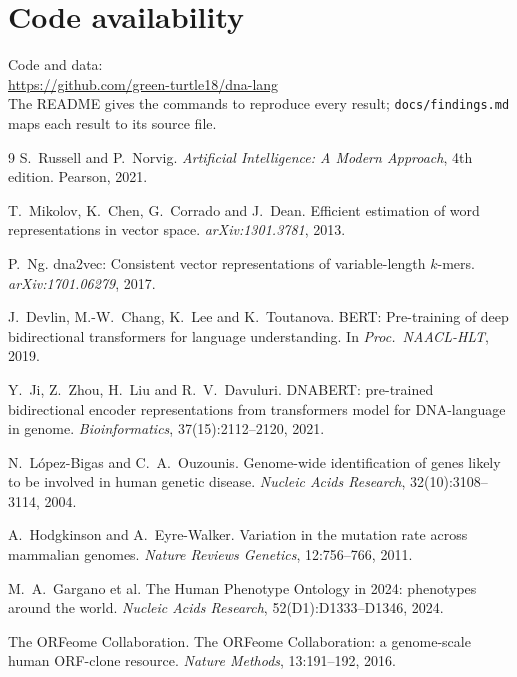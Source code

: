 \documentclass[11pt,a4paper,twocolumn]{article}
\newcommand{\githuburl}{https://github.com/green-turtle18/dna-lang}
\begin{document}
\section*{Code availability}
\noindent Code and data:\\
\url{\githuburl}\\
The README gives the commands to reproduce every result; \texttt{docs/findings.md}
maps each result to its source file.

\begin{thebibliography}{9}
\small
{}
S.~Russell and P.~Norvig.
\newblock \emph{Artificial Intelligence: A Modern Approach}, 4th edition.
\newblock Pearson, 2021.

T.~Mikolov, K.~Chen, G.~Corrado and J.~Dean.
\newblock Efficient estimation of word representations in vector space.
\newblock \emph{arXiv:1301.3781}, 2013.

P.~Ng.
\newblock dna2vec: Consistent vector representations of variable-length
  $k$-mers.
\newblock \emph{arXiv:1701.06279}, 2017.

J.~Devlin, M.-W.~Chang, K.~Lee and K.~Toutanova.
\newblock BERT: Pre-training of deep bidirectional transformers for language
  understanding.
\newblock In \emph{Proc.\ NAACL-HLT}, 2019.

Y.~Ji, Z.~Zhou, H.~Liu and R.~V.~Davuluri.
\newblock DNABERT: pre-trained bidirectional encoder representations from
  transformers model for DNA-language in genome.
\newblock \emph{Bioinformatics}, 37(15):2112--2120, 2021.

N.~L\'opez-Bigas and C.~A.~Ouzounis.
\newblock Genome-wide identification of genes likely to be involved in human
  genetic disease.
\newblock \emph{Nucleic Acids Research}, 32(10):3108--3114, 2004.

A.~Hodgkinson and A.~Eyre-Walker.
\newblock Variation in the mutation rate across mammalian genomes.
\newblock \emph{Nature Reviews Genetics}, 12:756--766, 2011.

M.~A.~Gargano et al.
\newblock The Human Phenotype Ontology in 2024: phenotypes around the world.
\newblock \emph{Nucleic Acids Research}, 52(D1):D1333--D1346, 2024.

The ORFeome Collaboration.
\newblock The ORFeome Collaboration: a genome-scale human ORF-clone resource.
\newblock \emph{Nature Methods}, 13:191--192, 2016.
\end{thebibliography}
\end{document}
